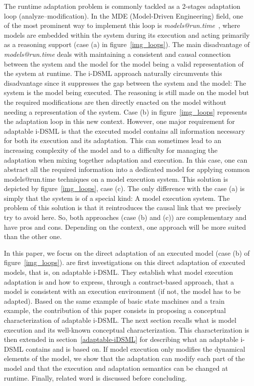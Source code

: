 \documentclass[english, 10pt]{llncs}
\begin{document}
The runtime adaptation problem is commonly tackled as a 2-stages
adaptation loop (analyze--modification). In the MDE (Model-Driven
Engineering) field, one of the most prominent way to implement this
loop is \textsl{models@run.time}~\cite{mart-computer09}, where models
are embedded within the system during its execution and acting
primarily as a reasoning support (case (a) in
figure~\ref{img_loops}). The main disadvantage of
\textsl{models@run.time} deals with maintaining a consistent and
causal connection between the system and the model for the model being
a valid representation of the system at runtime. The i-DSML approach
naturally circumvents this disadvantage since it suppresses the gap
between the system and the model: The system is the model being
executed. The reasoning is still made on the model but the required
modifications are then directly enacted on the model without needing a
representation of the system. Case (b) in figure~\ref{img_loops}
represents the adaptation loop in this new context. However, one major
requirement for adaptable i-DSML is that the executed model contains
all information necessary for both its execution and its
adaptation. This can sometimes lead to an increasing complexity of the
model and to a difficulty for managing the adaptation when mixing
together adaptation and execution. In this case, one can abstract all
the required information into a dedicated model for applying common
models@run.time techniques on a model execution system. This solution
is depicted by figure~\ref{img_loops}, case (c). The only difference
with the case (a) is simply that the system is of a special kind: A
model execution system. The problem of this solution is that it
reintroduces the causal link that we precisely try to avoid here. So,
both approaches (case (b) and (c)) are complementary and have pros and
cons. Depending on the context, one approach will be more suited than
the other one.

In this paper, we focus on the direct adaptation of an executed model
(case (b) of figure~\ref{img_loops}).
\cite{cariou-ciel12,cariou-mrt12} are first investigations on this
direct adaptation of executed models, that is, on adaptable i-DSML.
They establish what model execution adaptation is and how to express,
through a contract-based approach, that a model is consistent with an
execution environment (if not, the model has to be adapted). Based on
the same example of basic state machines and a train example, the
contribution of this paper consists in proposing a conceptual
characterization of adaptable i-DSML. The next section recalls what is
model execution and its well-known conceptual characterization. This
characterization is then extended in section~\ref{adaptable-iDSML} for
describing what an adaptable i-DSML contains and is based on. If model
execution only modifies the dynamical elements of the model, we show
that the adaptation can modify each part of the model and that the
execution and adaptation semantics can be changed at runtime. Finally,
related word is discussed before concluding.
\end{document}
